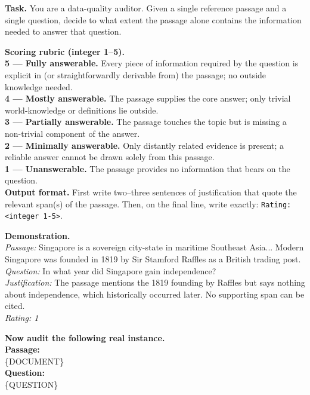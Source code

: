 
\begin{tcolorbox}[
    enhanced,
    colback=white,
    colframe=black,
    arc=5mm,
    boxrule=1pt,
    left=2mm,
    right=2mm,
    top=1mm,
    bottom=1mm
]

\textbf{Task.} You are a data-quality auditor. Given a single reference passage and a single question, decide to what extent the passage alone contains the information needed to answer that question.

\textbf{Scoring rubric (integer 1--5).}\\
\textbf{5 — Fully answerable.} Every piece of information required by the question is explicit in (or straightforwardly derivable from) the passage; no outside knowledge needed.\\
\textbf{4 — Mostly answerable.} The passage supplies the core answer; only trivial world-knowledge or definitions lie outside.\\
\textbf{3 — Partially answerable.} The passage touches the topic but is missing a non-trivial component of the answer.\\
\textbf{2 — Minimally answerable.} Only distantly related evidence is present; a reliable answer cannot be drawn solely from this passage.\\
\textbf{1 — Unanswerable.} The passage provides no information that bears on the question.\\

\textbf{Output format.} First write two--three sentences of justification that quote the relevant span(s) of the passage. Then, on the final line, write exactly: \texttt{Rating: <integer 1-5>}.

\textbf{Demonstration.}\\
\emph{Passage:} Singapore is a sovereign city-state in maritime Southeast Asia... Modern Singapore was founded in 1819 by Sir Stamford Raffles as a British trading post.\\
\emph{Question:} In what year did Singapore gain independence?\\
\emph{Justification:} The passage mentions the 1819 founding by Raffles but says nothing about independence, which historically occurred later. No supporting span can be cited.\\
\emph{Rating: 1}

\textbf{Now audit the following real instance.}\\
\textbf{Passage:}\\
\{DOCUMENT\}\\

\textbf{Question:}\\
\{QUESTION\}\\

\end{tcolorbox}

